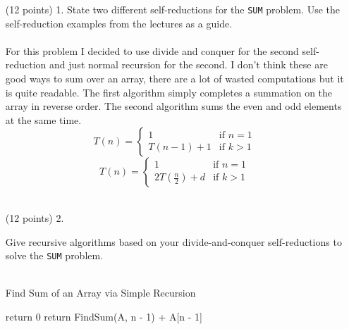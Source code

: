 \documentclass[paper=a4,fontsize=11pt]{article}
\begin{document}
\begin{enumerate}
\item [(12 points) 1.] State two different self-reductions for the \texttt{SUM} problem. Use the self-reduction examples from the lectures as a guide.\\
\\For this problem I decided to use divide and conquer for the second self-reduction and just normal recursion for the second. I don't think these are good ways to sum over an array, there are a lot of wasted computations but it is quite readable. The first algorithm simply completes a summation on the array in reverse order. The second algorithm sums the even and odd elements at the same time.{
\[
  T(n) =
    \begin{cases}
        1 & \text{if $n = 1$} \\
        T(n - 1) + 1 & \text{if $k > 1$}
    \end{cases}
\]
\[
  T(n) =
    \begin{cases}
        1 & \text{if $n = 1$} \\
        2T(\frac{n}{2}) + d & \text{if $k > 1$}
    \end{cases}
\]
}
\\\item [(12 points) 2.]{ Give recursive algorithms based on your divide-and-conquer self-reductions to solve the \texttt{SUM} problem.\\\\
\begin{algorithm}
\caption{Find Sum of an Array via Simple Recursion}
\label{array-sum}
\begin{algorithmic}[1]
        \State return 0
    \Else
        \State return FindSum(A, n - 1) + A[n - 1]
    \EndIf
\EndProcedure
\end{algorithmic}
\end{algorithm}

}
\end{enumerate}
\end{document}
